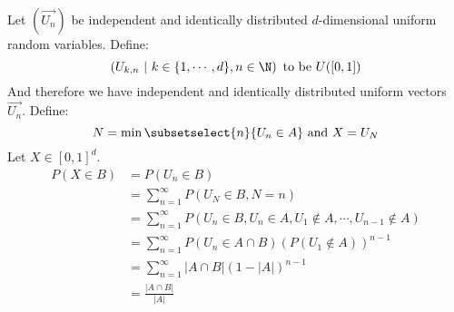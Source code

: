 \documentclass[../Main.tex]{subfiles}
\begin{document}
Let $(\vec{U_n})$ be independent and identically distributed $d$-dimensional uniform random variables. Define:
\begin{equation*}
    \left(U_{k, n}~|~k \in \{1, \cdots, d\}, n\in\N\right) \text{ to be } U([0, 1])
\end{equation*}
And therefore we have independent and identically distributed uniform vectors $\vec{U_n}$. Define:
\begin{equation*}
    N = \min\subsetselect{n}{U_n \in A} \text{ and } X = U_N
\end{equation*}
Let $X \in [0, 1]^d$.
\begin{align*}
    P(X \in B) &= P(U_n \in B) \\
    &= \sum_{n = 1}^\infty P(U_N \in B, N = n) \\
    &= \sum_{n = 1}^\infty P(U_n \in B, U_n \in A, U_1 \notin A, \cdots, U_{n-1} \notin A) \\
    &= \sum_{n = 1}^\infty P(U_n \in A \cap B) \left(P(U_1 \notin A)\right)^{n-1} \\
    &= \sum_{n = 1}^\infty |A \cap B| \left(1 - |A|\right)^{n-1} \\
    &= \frac{|A \cap B|}{|A|}
\end{align*}
\end{document}
